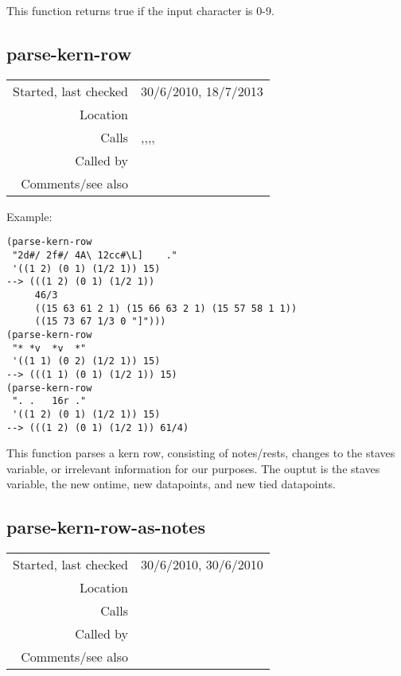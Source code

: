 \noindent This function returns true if the input
character is 0-9.


\subsection*{parse-kern-row}\label{fun:parse-kern-row}

\vspace{0.3cm}
\begin{tabular}{r|p{8cm}}
Started, last checked & 30/6/2010, 18/7/2013 \\
Location & \nameref{sec:kern} \\
Calls & \nameref{fun:not-tie-dur-pitch-char-p},\newline \nameref{fun:parse-kern-row-as-notes},\newline \nameref{fun:space-bar-separated-string2list},\newline \nameref{fun:tab-separated-string2list},\newline \nameref{fun:update-staves-variable} \\
Called by & \nameref{fun:kern-file2dataset} \\
Comments/see also &
\end{tabular}

\vspace{0.5cm}
\noindent Example:
\begin{Verbatim}[showtabs=true]
(parse-kern-row
 "2d#/ 2f#/	4A\	12cc#\L]	."
 '((1 2) (0 1) (1/2 1)) 15)
--> (((1 2) (0 1) (1/2 1))
     46/3
     ((15 63 61 2 1) (15 66 63 2 1) (15 57 58 1 1))
     ((15 73 67 1/3 0 "]")))
(parse-kern-row
 "*	*v	*v	*"
 '((1 1) (0 2) (1/2 1)) 15)
--> (((1 1) (0 1) (1/2 1)) 15)
(parse-kern-row
 ".	.	16r	."
 '((1 2) (0 1) (1/2 1)) 15)
--> (((1 2) (0 1) (1/2 1)) 61/4)
\end{Verbatim}

\noindent This function parses a kern row, consisting
of notes/rests, changes to the staves variable, or
irrelevant information for our purposes. The ouptut is
the staves variable, the new ontime, new datapoints,
and new tied datapoints.


\subsection*{parse-kern-row-as-notes}\label{fun:parse-kern-row-as-notes}

\vspace{0.3cm}
\begin{tabular}{r|p{8cm}}
Started, last checked & 30/6/2010, 30/6/2010 \\
Location & \nameref{sec:kern} \\
Calls & \nameref{fun:parse-kern-spaced-notes} \\
Called by & \nameref{fun:parse-kern-row} \\
Comments/see also &
\end{tabular}

